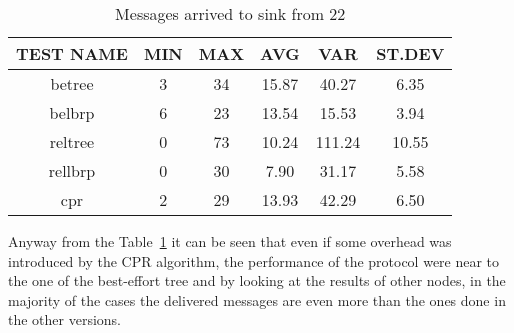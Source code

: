 \documentclass{article}
\begin{document}
		\begin{table}[H]
			\begin{center}
			    \begin{tabular}{|c|c|c|c|c|c|}
				    \hline
				    TEST NAME & MIN & MAX & AVG & VAR & ST.DEV\\ \hline
					betree & 3 & 34 & 15.87 & 40.27 & 6.35\\ \hline
					belbrp & 6 & 23 & 13.54 & 15.53 & 3.94\\ \hline
					reltree & 0 & 73 & 10.24 & 111.24 & 10.55\\ \hline
					rellbrp & 0 & 30 & 7.90 & 31.17 & 5.58\\ \hline
					cpr & 2 & 29 & 13.93 & 42.29 & 6.50\\ \hline
			    \end{tabular}
			\end{center}	
			\caption{Messages arrived to sink from 22}
			\label{tab:25Arrivals22}
		\end{table}

Anyway from the Table~\ref{tab:25Arrivals22} it can be seen that even if some overhead was introduced by the CPR algorithm, the performance of the protocol were near to the one of the best-effort tree and by looking at the results of other nodes, in the majority of the cases the delivered messages are even more than the ones done in the other versions.


\end{document}
